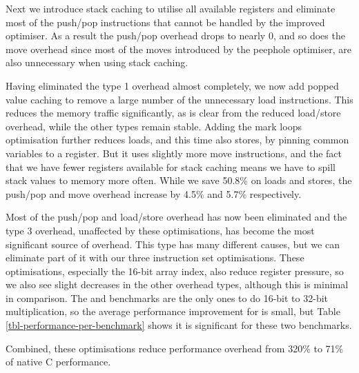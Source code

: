 Next we introduce stack caching to utilise all available registers and eliminate most of the push/pop instructions that cannot be handled by the improved optimiser. As a result the push/pop overhead drops to nearly 0, and so does the move overhead since most of the moves introduced by the peephole optimiser, are also unnecessary when using stack caching.

Having eliminated the type 1 overhead almost completely, we now add popped value caching to remove a large number of the unnecessary load instructions. This reduces the memory traffic significantly, as is clear from the reduced load/store overhead, while the other types remain stable. Adding the mark loops optimisation further reduces loads, and this time also stores, by pinning common variables to a register. But it uses slightly more move instructions, and the fact that we have fewer registers available for stack caching means we have to spill stack values to memory more often. While we save 50.8\% on loads and stores, the push/pop and move overhead increase by 4.5\% and 5.7\% respectively.

Most of the push/pop and load/store overhead has now been eliminated and the type 3 overhead, unaffected by these optimisations, has become the most significant source of overhead. This type has many different causes, but we can eliminate part of it with our three instruction set optimisations. These optimisations, especially the 16-bit array index, also reduce register pressure, so we also see slight decreases in the other overhead types, although this is minimal in comparison. The  and  benchmarks are the only ones to do 16-bit to 32-bit multiplication, so the average performance improvement for  is small, but Table \ref{tbl-performance-per-benchmark} shows it is significant for these two benchmarks.

Combined, these optimisations reduce performance overhead from 320\% to 71\% of native C performance.
